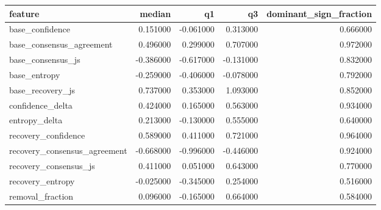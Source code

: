 \begin{tabular}{lrrrr}
\toprule
feature & median & q1 & q3 & dominant_sign_fraction \\
\midrule
base_confidence & 0.151000 & -0.061000 & 0.313000 & 0.666000 \\
base_consensus_agreement & 0.496000 & 0.299000 & 0.707000 & 0.972000 \\
base_consensus_js & -0.386000 & -0.617000 & -0.131000 & 0.832000 \\
base_entropy & -0.259000 & -0.406000 & -0.078000 & 0.792000 \\
base_recovery_js & 0.737000 & 0.353000 & 1.093000 & 0.852000 \\
confidence_delta & 0.424000 & 0.165000 & 0.563000 & 0.934000 \\
entropy_delta & 0.213000 & -0.130000 & 0.555000 & 0.640000 \\
recovery_confidence & 0.589000 & 0.411000 & 0.721000 & 0.964000 \\
recovery_consensus_agreement & -0.668000 & -0.996000 & -0.446000 & 0.924000 \\
recovery_consensus_js & 0.411000 & 0.051000 & 0.643000 & 0.770000 \\
recovery_entropy & -0.025000 & -0.345000 & 0.254000 & 0.516000 \\
removal_fraction & 0.096000 & -0.165000 & 0.664000 & 0.584000 \\
\bottomrule
\end{tabular}
